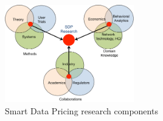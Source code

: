  \begin{figure}
\centering
\includegraphics[width = 0.5\textwidth]{Figures/Sdp-theme.pdf}
\vspace{-0.1in}
\caption{Smart Data Pricing research components}
\label{fig:theme}
\vspace{-0.05in}
\end{figure}




